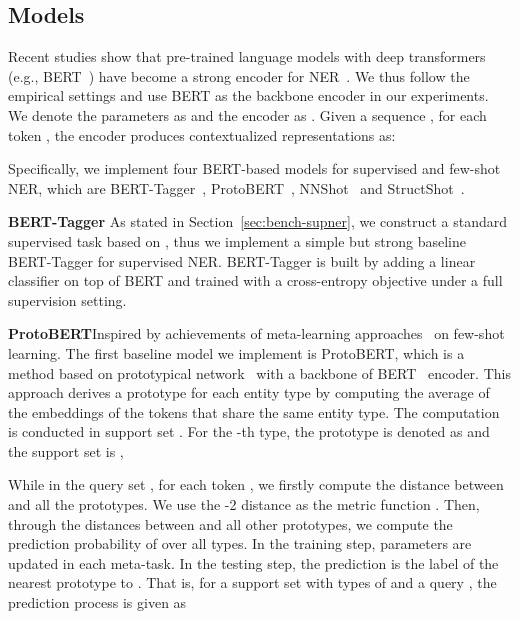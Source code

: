 \documentclass[11pt,a4paper, dvipsnames]{article}
\begin{document}
\label{sec:exp}


         


\subsection{Models}
\label{sec:models}

Recent studies show that pre-trained language models with deep transformers (e.g., BERT~\cite{devlin2018bert}) have become a strong encoder for NER~\cite{li2020unified}. We thus follow the empirical settings and use BERT as the backbone encoder in our experiments. We denote the parameters as  and the encoder as . Given a sequence ,
for each token , the encoder produces contextualized representations as:

Specifically, we implement four BERT-based models for supervised and few-shot NER, which are BERT-Tagger~\cite{devlin-etal-2019-bert}, ProtoBERT~\cite{snell2017prototypical}, NNShot~\cite{yang2020simple} and StructShot~\cite{yang2020simple}.

\noindent \textbf{BERT-Tagger} \quad As stated in Section~\ref{sec:bench-supner}, we construct a standard supervised task based on , thus we implement a simple but strong baseline BERT-Tagger for supervised NER. BERT-Tagger is built by adding a linear classifier on top of BERT and trained with a cross-entropy objective under a full supervision setting. 

\noindent \textbf{ProtoBERT}\quad Inspired by achievements of meta-learning approaches~\cite{finn2017model, snell2017prototypical,ding2021prototypical} on few-shot learning.
The first baseline model we implement is ProtoBERT, which is a method based on prototypical network~\cite{snell2017prototypical} with a backbone of BERT~\cite{devlin2018bert} encoder. This approach derives a prototype  for each entity type by computing the average of the embeddings of the tokens that share the same entity type. The computation is conducted in support set . For the -th type, the prototype is denoted as  and the support set is ,

While in the query set , for each token , we firstly compute the distance between  and all the prototypes. We use the -2 distance as the metric function . Then, through the distances between  and all other prototypes, we compute the prediction probability of  over all types. In the training step, parameters are updated in each meta-task. In the testing step, the prediction is the label of the nearest prototype to . That is, for a support set  with types of  and a query , the prediction process is given as
\end{document}

